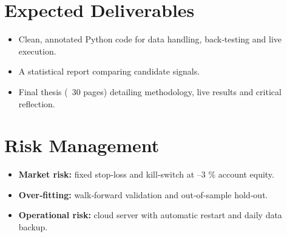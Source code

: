 \documentclass[a4paper,12pt]{article}
\begin{document}
\section{Expected Deliverables}

\begin{itemize}
  \item Clean, annotated Python code for data handling, back‑testing and
        live execution.
  \item A statistical report comparing candidate signals.
  \item Final thesis (~30 pages) detailing methodology, live results and
        critical reflection.
\end{itemize}

\section{Risk Management}

\begin{itemize}
  \item \textbf{Market risk:} fixed stop‑loss and kill‑switch at
        –3 \% account equity.
  \item \textbf{Over‑fitting:} walk‑forward validation and
        out‑of‑sample hold‑out.
  \item \textbf{Operational risk:} cloud server with automatic restart
        and daily data backup.
\end{itemize}



\end{document}
